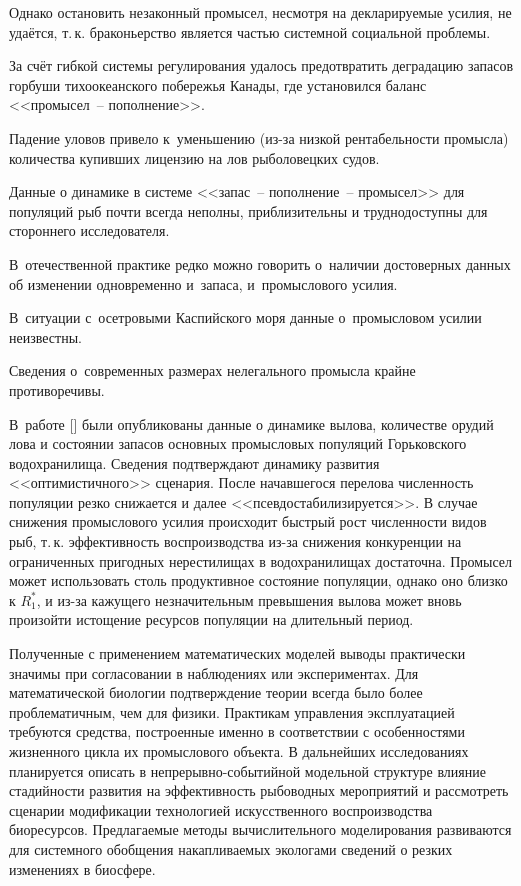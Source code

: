 Однако остановить незаконный промысел, несмотря на декларируемые усилия, не удаётся, т.\,к. браконьерство является частью системной социальной проблемы.



За счёт гибкой системы регулирования удалось предотвратить деградацию запасов горбуши тихоокеанского побережья Канады, где установился баланс <<промысел~-- пополнение>>. 

Падение уловов привело к~уменьшению (из-за низкой рентабельности промысла) количества купивших лицензию на лов рыболовецких судов.



\smallskip




Данные о динамике в системе <<запас~-- пополнение~-- промысел>> для популяций рыб почти всегда неполны, приблизительны и труднодоступны для стороннего исследователя. 

В~отечественной практике редко можно говорить о~наличии достоверных данных об изменении одновременно и~запаса, и~промыслового усилия. 

В~ситуации с~осетровыми Каспийского моря данные о~промысловом усилии неизвестны. 

Сведения о~современных размерах нелегального промысла крайне противоречивы. 

В~работе [] были опубликованы данные о динамике вылова, количестве орудий лова и состоянии запасов основных промысловых популяций Горьковского водохранилища. Сведения подтверждают динамику развития <<оптимистичного>> сценария. После начавшегося перелова численность популяции резко снижается и далее <<псевдостабилизируется>>. В случае снижения промыслового усилия  происходит быстрый рост численности видов рыб, т.\,к. эффективность воспроизводства из-за снижения конкуренции на ограниченных пригодных нерестилищах в водохранилищах достаточна. Промысел может использовать столь продуктивное состояние популяции, однако оно близко к $R^*_1$, и из-за кажущего незначительным превышения вылова может вновь произойти истощение ресурсов популяции на длительный период.



Полученные с применением математических моделей выводы практически значимы при согласовании в наблюдениях или экспериментах. Для математической биологии подтверждение теории всегда было более проблематичным, чем для физики. Практикам управления эксплуатацией требуются средства, построенные именно в соответствии с особенностями жизненного цикла их промыслового объекта. В дальнейших исследованиях планируется описать в непрерывно-событийной модельной структуре влияние стадийности развития на эффективность рыбоводных мероприятий и рассмотреть сценарии модификации технологией искусственного воспроизводства биоресурсов. Предлагаемые методы вычислительного моделирования развиваются для системного обобщения накапливаемых экологами сведений о резких изменениях в биосфере.



